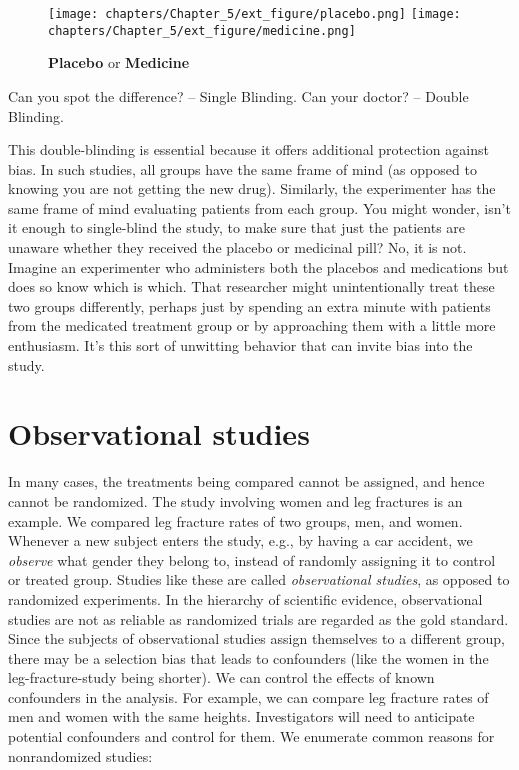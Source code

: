 \documentclass[11pt]{book}\usepackage[]{graphicx}\usepackage[]{color}
\begin{document}

\begin{figure}[ht]
   \centering
   \texttt{[image: chapters/Chapter\_5/ext\_figure/placebo.png]}
   \texttt{[image: chapters/Chapter\_5/ext\_figure/medicine.png]}
    \caption{\textbf{Placebo} or \textbf{Medicine}}
\end{figure}

Can you spot the difference? -- Single Blinding.  Can your doctor? -- Double Blinding. 

This double-blinding is essential because it offers additional protection against bias. In such studies, all groups have the same frame of mind (as opposed to knowing you are not getting the new drug). Similarly, the experimenter has the same frame of mind evaluating patients from each group. You might wonder, isn't it enough to single-blind the study, to make sure that just the patients are unaware whether they received the placebo or medicinal pill? No, it is not. Imagine an experimenter who administers both the placebos and medications but does so know which is which. That researcher might unintentionally treat these two groups differently, perhaps just by spending an extra minute with patients from the medicated treatment group or by approaching them with a little more enthusiasm. It's this sort of unwitting behavior that can invite bias into the study.

\section{Observational studies}

In many cases, the treatments being compared cannot be assigned, and hence cannot be randomized.  The study involving women and leg fractures is an example.  We compared leg fracture rates of two groups, men, and women.  Whenever a new subject enters the study, e.g., by having a car accident, we \textit{observe} what gender they belong to, instead of randomly assigning it to control or treated group.  Studies like these are called \textit{observational studies}, as opposed to randomized experiments.  In the hierarchy of scientific evidence, observational studies are not as reliable as randomized trials are regarded as the gold standard. Since the subjects of observational studies assign themselves to a different group, there may be a selection bias that leads to confounders (like the women in the leg-fracture-study being shorter).  We can control the effects of known confounders in the analysis.  For example, we can compare leg fracture rates of men and women with the same heights.  Investigators will need to anticipate potential confounders and control for them. We enumerate common reasons for nonrandomized studies:
\end{document}
